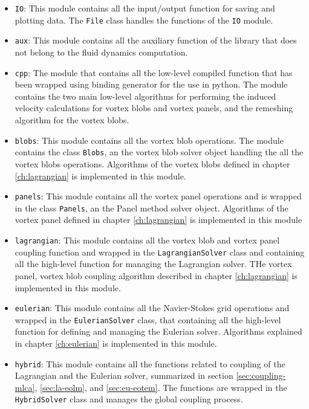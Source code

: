 \begin{itemize}
\item \texttt{IO}: This module contains all the input/output function for saving and plotting data. The \texttt{File} class handles the functions of the \texttt{IO} module.
\item \texttt{aux}: This module contains all the auxiliary function of the library that does not belong to the fluid dynamics computation.
\item \texttt{cpp}: The module that contains all the low-level compiled function that has been wrapped using binding generator for the use in python. The module contains the two main low-level algorithms for performing the induced velocity calculations for vortex blobs and vortex panels, and the remeshing algorithm for the vortex blobs.
\item \texttt{blobs}: This module contains all the vortex blob operations. The module contains the class \texttt{Blobs}, an the vortex blob solver object handling the all the vortex blobs operations. Algorithms of the vortex blobs defined in chapter \ref{ch:lagrangian} is implemented in this module.
\item \texttt{panels}: This module contains all the vortex panel operations and is wrapped in the class \texttt{Panels}, an the Panel method solver object. Algorithms of the vortex panel defined in chapter \ref{ch:lagrangian} is implemented in this module
\item \texttt{lagrangian}: This module contains all the vortex blob and vortex panel coupling function and wrapped in the \texttt{LagrangianSolver} class and containing all the high-level function for managing the Lagrangian solver. THe vortex panel, vortex blob coupling algorithm described in chapter \ref{ch:lagrangian} is implemented in this module.
\item \texttt{eulerian}: This module contains all the Navier-Stokes grid operations and wrapped in the \texttt{EulerianSolver} class, that containing all the high-level function for defining and managing the Eulerian solver. Algorithms explained in chapter \ref{ch:eulerian} is implemented in this module.
\item \texttt{hybrid}: This module contains all the functions related to coupling of the Lagrangian and the Eulerian solver, summarized in section \ref{sec:coupling-mlca}, \ref{sec:la-eolm}, and \ref{sec:eu-eotem}. The functions are wrapped in the \texttt{HybridSolver} class and manages the global coupling process.

\end{itemize}

